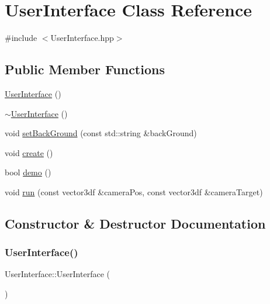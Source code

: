 \hypertarget{class_user_interface}{}\section{User\+Interface Class Reference}
\label{class_user_interface}


{\ttfamily \#include $<$User\+Interface.\+hpp$>$}

\subsection*{Public Member Functions}
\begin{DoxyCompactItemize}
\item 
\mbox{\hyperlink{class_user_interface_ae6fb70370701b3bd6120e923df9705b0}{User\+Interface}} ()
\item 
\mbox{\hyperlink{class_user_interface_ae588b2ff1711a016dd4c6fc5002c0841}{$\sim$\+User\+Interface}} ()
\item 
void \mbox{\hyperlink{class_user_interface_a7d7a15f22c081ea83232514bcd6e0714}{set\+Back\+Ground}} (const std\+::string \&back\+Ground)
\item 
void \mbox{\hyperlink{class_user_interface_ac993eb9b40acf254ac7efe8241bf430d}{create}} ()
\item 
bool \mbox{\hyperlink{class_user_interface_a360c0145392db91b100952a0155e96ff}{demo}} ()
\item 
void \mbox{\hyperlink{class_user_interface_adddc6cfce94ec78f52859473b5ec9344}{run}} (const vector3df \&camera\+Pos, const vector3df \&camera\+Target)
\end{DoxyCompactItemize}


\subsection{Constructor \& Destructor Documentation}
\mbox{\label{class_user_interface_ae6fb70370701b3bd6120e923df9705b0}} 
\subsubsection{\texorpdfstring{UserInterface()}{UserInterface()}}
{\footnotesize\ttfamily User\+Interface\+::\+User\+Interface (\begin{DoxyParamCaption}{ }\end{DoxyParamCaption})}


